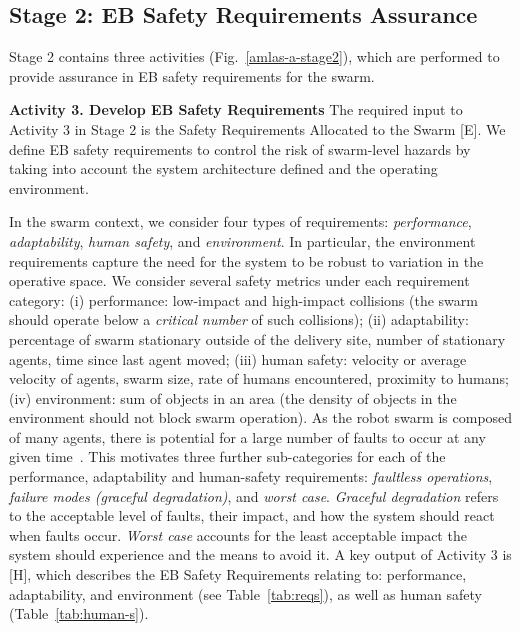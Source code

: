 \documentclass[runningheads]{llncs}
\begin{document}
\subsection{Stage 2: EB Safety Requirements Assurance} \label{framework-stage2}
Stage 2 contains three activities (Fig.~\ref{amlas-a-stage2}), which are performed to provide assurance in EB safety requirements for the swarm. 

\noindent\textbf{Activity 3. Develop EB Safety Requirements} The required input to Activity 3 in Stage 2 is the Safety Requirements Allocated to the Swarm [E]. 
We define EB safety requirements to control the risk of swarm-level hazards by taking into account the system architecture defined and the operating environment. 

In the swarm context, we consider four types of requirements: \emph{performance}, \emph{adaptability}, \emph{human safety}, and \emph{environment}. 
In particular, the environment requirements capture the need for the system to be robust to variation in the operative space.
We consider several safety metrics under each requirement category: 
(i) performance: low-impact and high-impact collisions (the swarm should operate below a \emph{critical number} of such collisions);
(ii) adaptability: percentage of swarm stationary outside of the delivery site, number of stationary agents, time since last agent moved; 
(iii) human safety: velocity or average velocity of agents, swarm size, rate of humans encountered, proximity to humans;
(iv) environment: sum of objects in an area (the density of objects in the environment should not block swarm operation).
As the robot swarm is composed of many agents, there is potential for a large number of faults to occur at any given time~\cite{Lee2022}. This motivates three further sub-categories for each of the performance, adaptability and human-safety requirements: \emph{faultless operations}, \emph{failure modes (graceful degradation)}, and \emph{worst case}. 
\emph{Graceful degradation} refers to the acceptable level of faults, their impact, and how the system should react when faults occur. \emph{Worst case} accounts for the least acceptable impact the system should experience and the means to avoid it. 
A key output of Activity 3 is [H], which describes the EB Safety Requirements relating to: performance, adaptability, and environment (see Table~\ref{tab:reqs}), as well as human safety (Table~\ref{tab:human-s}).
\end{document}
